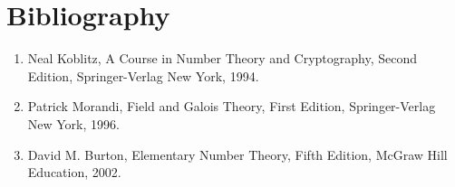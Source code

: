 \documentclass[12pt]{article}
\begin{document}
\section{Bibliography}

\begin{enumerate}
\item Neal Koblitz, A Course in Number Theory and Cryptography, Second Edition, Springer-Verlag New York, 1994.
\item Patrick Morandi, Field and Galois Theory, First Edition, Springer-Verlag New York, 1996.
\item David M. Burton, Elementary Number Theory, Fifth Edition, McGraw Hill Education, 2002.


\end{enumerate}
\end{document}
